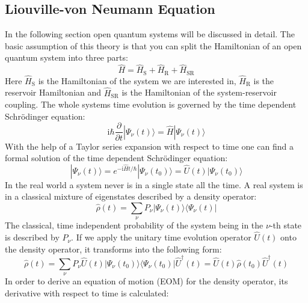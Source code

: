 \documentclass[9pt]{report}
\begin{document}
\subsection{Liouville-von Neumann Equation}
In the following section open quantum systems will be discussed in detail. The basic assumption of this theory is that you can split the Hamiltonian of an open quantum system into three parts:
\begin{equation}
\hat{H}=\hat{H}_{\mathrm{S}}+\hat{H}_{\mathrm{R}}+\hat{H}_{\mathrm{SR}}
\end{equation}
Here $\hat{H}_{\mathrm{S}}$ is the Hamiltonian of the system we are interested in, $\hat{H}_{\mathrm{R}}$ is the reservoir Hamiltonian and $\hat{H}_{\mathrm{SR}}$ is the Hamiltonian of the system-reservoir coupling. The whole systems time evolution is governed by the time dependent Schrödinger equation:
\begin{equation}
\mathrm{i}\hbar\frac{\partial}{\partial t}|\Psi_{\nu}(t)\rangle = \hat{H}|\Psi_{\nu}(t)\rangle
\end{equation}
With the help of a Taylor series expansion with respect to time one can find a formal solution of the time dependent Schrödinger equation:
\begin{equation}
|\Psi_{\nu}(t)\rangle = e^{-\mathrm{i}\hat{H}t/\hbar}|\Psi_{\nu}(t_0)\rangle = \hat{U}(t) |\Psi_{\nu}(t_0)\rangle
\end{equation}
In the real world a system never is in a single state all the time. A real system is in a classical mixture of eigenstates described by a density operator:
\begin{equation}
\hat{\rho}(t) = \sum_{\nu}P_{\nu}|\Psi_{\nu}(t)\rangle\langle\Psi_{\nu}(t)|\label{Density Operator}
\end{equation}
The classical, time independent probability of the system being in the $\nu$-th state is described by $P_{\nu}$. If we apply the unitary time evolution operator $\hat{U}(t)$ onto the density operator, it transforms into the following form:
\begin{equation}
\hat{\rho}(t) = \sum_{\nu}P_{\nu}\hat{U}(t)|\Psi_{\nu}(t_0)\rangle\langle\Psi_{\nu}(t_0)|\hat{U}^{\dagger}(t) = \hat{U}(t)\hat{\rho}(t_0)\hat{U}^{\dagger}(t)
\end{equation}
In order to derive an equation of motion (EOM) for the density operator, its derivative with respect to time is calculated:
\end{document}

